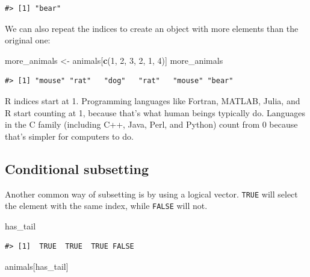 \documentclass[]{book}
\newenvironment{Shaded}{\begin{snugshade}}{\end{snugshade}}
\newcommand{\KeywordTok}[1]{\textcolor[rgb]{0.13,0.29,0.53}{\textbf{#1}}}
\newcommand{\DecValTok}[1]{\textcolor[rgb]{0.00,0.00,0.81}{#1}}
\newcommand{\StringTok}[1]{\textcolor[rgb]{0.31,0.60,0.02}{#1}}
\newcommand{\NormalTok}[1]{#1}
\begin{document}
\begin{verbatim}
#> [1] "bear"
\end{verbatim}

We can also repeat the indices to create an object with more elements
than the original one:

\begin{Shaded}
\begin{Highlighting}[]
\NormalTok{more_animals <-}\StringTok{ }\NormalTok{animals[}\KeywordTok{c}\NormalTok{(}\DecValTok{1}\NormalTok{, }\DecValTok{2}\NormalTok{, }\DecValTok{3}\NormalTok{, }\DecValTok{2}\NormalTok{, }\DecValTok{1}\NormalTok{, }\DecValTok{4}\NormalTok{)]}
\NormalTok{more_animals}
\end{Highlighting}
\end{Shaded}

\begin{verbatim}
#> [1] "mouse" "rat"   "dog"   "rat"   "mouse" "bear"
\end{verbatim}

R indices start at 1. Programming languages like Fortran, MATLAB, Julia,
and R start counting at 1, because that's what human beings typically
do. Languages in the C family (including C++, Java, Perl, and Python)
count from 0 because that's simpler for computers to do.

\subsection{Conditional subsetting}\label{conditional-subsetting}

Another common way of subsetting is by using a logical vector.
\texttt{TRUE} will select the element with the same index, while
\texttt{FALSE} will not.

\begin{Shaded}
\begin{Highlighting}[]
\NormalTok{has_tail}
\end{Highlighting}
\end{Shaded}

\begin{verbatim}
#> [1]  TRUE  TRUE  TRUE FALSE
\end{verbatim}

\begin{Shaded}
\begin{Highlighting}[]
\NormalTok{animals[has_tail]}
\end{Highlighting}
\end{Shaded}
\end{document}
